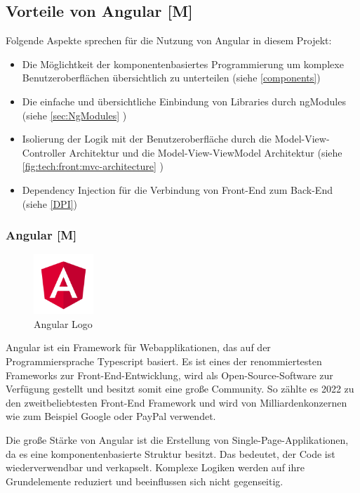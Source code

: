 \subsection{Vorteile von Angular [M]}
Folgende Aspekte sprechen für die Nutzung von Angular in diesem Projekt:

\begin{itemize}
  \item Die Möglichtkeit der komponentenbasiertes Programmierung um komplexe Benutzeroberflächen übersichtlich zu unterteilen (siehe \ref{components}) 
  \item Die einfache und übersichtliche Einbindung von Libraries durch ngModules (siehe \ref{sec:NgModules} )
  \item Isolierung der Logik mit der Benutzeroberfläche durch die Model-View-Controller Architektur und die Model-View-ViewModel Architektur (siehe \ref{fig:tech:front:mvc-architecture} )
  \item 
  Dependency Injection für die Verbindung von Front-End zum Back-End (siehe \ref{DPI})
\end{itemize}

\subsubsection{Angular [M]}
\begin{figure}
  \begin{center}
    \includegraphics[width=0.2\textwidth]{pics/AngularLogo.png}
   \caption{Angular Logo}
  \end{center}
\end{figure}
Angular ist ein Framework für Webapplikationen, das auf der Programmiersprache Typescript basiert. Es ist eines der renommiertesten Frameworks zur Front-End-Entwicklung, wird als Open-Source-Software zur Verfügung gestellt und besitzt somit eine große Community. So zählte es 2022 zu den zweitbeliebtesten Front-End Framework \cite{AngularEvidence} und wird von Milliardenkonzernen wie zum Beispiel Google oder PayPal verwendet. 
\cite{AngularEvidence2}

Die große Stärke von Angular ist die Erstellung von Single-Page-Applikationen, da es eine komponentenbasierte Struktur besitzt. Das bedeutet, der Code ist wiederverwendbar und verkapselt. Komplexe Logiken werden auf ihre Grundelemente reduziert und beeinflussen sich nicht gegenseitig. \cite{AngularGeneral}



